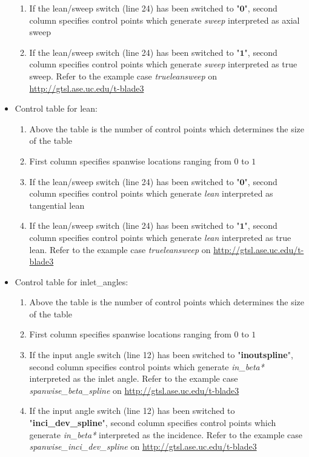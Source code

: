 \documentclass[8pt]{article}
\begin{document}
\begin{itemize}[leftmargin=*]
\begin{enumerate}[label=\alph*]
        \item If the lean/sweep switch (line 24) has been switched to "$\mathbf{0}$", second column specifies control points which generate \textit{sweep} interpreted as axial sweep
        \item If the lean/sweep switch (line 24) has been switched to "$\mathbf{1}$", second column specifies control points which generate \textit{sweep} interpreted as true sweep. Refer to the example case \textit{trueleansweep} on \url{http://gtsl.ase.uc.edu/t-blade3}
    \end{enumerate}
    \item Control table for lean:
    \begin{enumerate}[label=\alph*]
        \item Above the table is the number of control points which determines the size of the table
        \item First column specifies spanwise locations ranging from $0$ to $1$
        \item If the lean/sweep switch (line 24) has been switched to "$\mathbf{0}$", second column specifies control points which generate \textit{lean} interpreted as tangential lean
        \item If the lean/sweep switch (line 24) has been switched to "$\mathbf{1}$", second column specifies control points which generate \textit{lean} interpreted as true lean. Refer to the example case \textit{trueleansweep} on \url{http://gtsl.ase.uc.edu/t-blade3}
    \end{enumerate}
    \item Control table for inlet\_angles:
    \begin{enumerate}[label=\alph*]
        \item Above the table is the number of control points which determines the size of the table
        \item First column specifies spanwise locations ranging from $0$ to $1$
        \item If the input angle switch (line 12) has been switched to "\textbf{inoutspline}", second column specifies control points which generate \textit{in\_beta*} interpreted as the inlet angle. Refer to the example case \textit{spanwise\_beta\_spline} on \url{http://gtsl.ase.uc.edu/t-blade3}
        \item If the input angle switch (line 12) has been switched to "\textbf{inci\_dev\_spline}", second column specifies control points which generate \textit{in\_beta*} interpreted as the incidence. Refer to the example case \textit{spanwise\_inci\_dev\_spline} on \url{http://gtsl.ase.uc.edu/t-blade3}

\end{enumerate}
\end{itemize}
\end{document}

